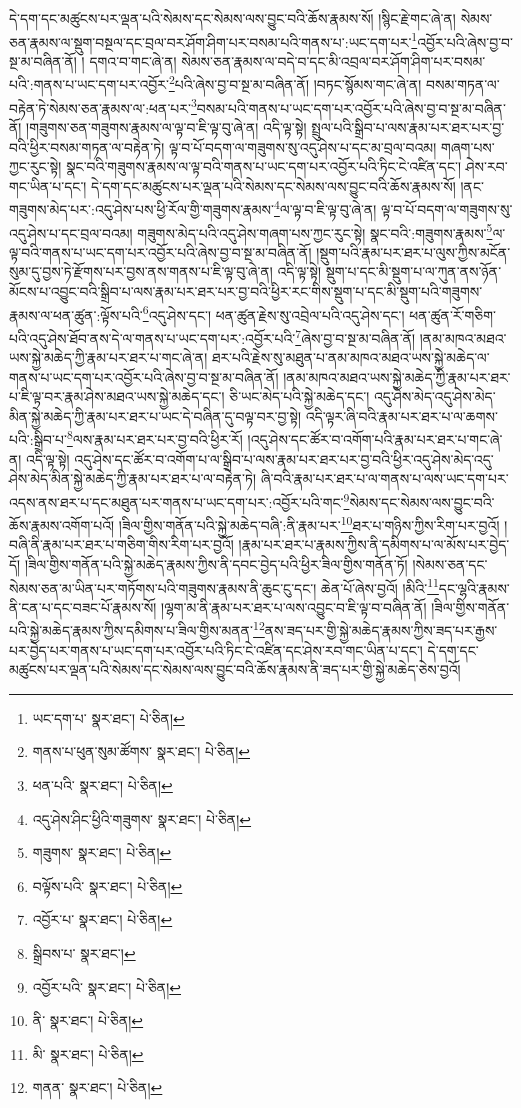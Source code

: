དེ་དག་དང་མཚུངས་པར་ལྡན་པའི་སེམས་དང་སེམས་ལས་བྱུང་བའི་ཆོས་རྣམས་སོ། །སྙིང་རྗེ་གང་ཞེ་ན། སེམས་ཅན་རྣམས་ལ་སྡུག་བསྔལ་དང་བྲལ་བར་ཤོག་ཤིག་པར་བསམ་པའི་གནས་པ་:ཡང་དག་པར་\footnote{ཡང་དག་པ་  སྣར་ཐང་།  པེ་ཅིན། }འབྱོར་པའི་ཞེས་བྱ་བ་སྔ་མ་བཞིན་ནོ། །
དགའ་བ་གང་ཞེ་ན། སེམས་ཅན་རྣམས་ལ་བདེ་བ་དང་མི་འབྲལ་བར་ཤོག་ཤིག་པར་བསམ་པའི་:གནས་པ་ཡང་དག་པར་འབྱོར་\footnote{གནས་པ་ཕུན་སུམ་ཚོགས་  སྣར་ཐང་།  པེ་ཅིན། }པའི་ཞེས་བྱ་བ་སྔ་མ་བཞིན་ནོ། །བཏང་སྙོམས་གང་ཞེ་ན། བསམ་གཏན་ལ་བརྟེན་ཏེ་སེམས་ཅན་རྣམས་ལ་:ཕན་པར་\footnote{ཕན་པའི་  སྣར་ཐང་།  པེ་ཅིན། }བསམ་པའི་གནས་པ་ཡང་དག་པར་འབྱོར་པའི་ཞེས་བྱ་བ་སྔ་མ་བཞིན་ནོ། །གཟུགས་ཅན་གཟུགས་རྣམས་ལ་ལྟ་བ་ཇི་ལྟ་བུ་ཞེ་ན། འདི་ལྟ་སྟེ། སྤྲུལ་པའི་སྒྲིབ་པ་ལས་རྣམ་པར་ཐར་པར་བྱ་བའི་ཕྱིར་བསམ་གཏན་ལ་བརྟེན་ཏེ། ལྟ་བ་པོ་བདག་ལ་གཟུགས་སུ་འདུ་ཤེས་པ་དང་མ་བྲལ་བའམ། གཞག་པས་ཀྱང་རུང་སྟེ། སྣང་བའི་གཟུགས་རྣམས་ལ་ལྟ་བའི་གནས་པ་ཡང་དག་པར་འབྱོར་པའི་ཏིང་ངེ་འཛིན་དང་། ཤེས་རབ་གང་ཡིན་པ་དང་། དེ་དག་དང་མཚུངས་པར་ལྡན་པའི་སེམས་དང་སེམས་ལས་བྱུང་བའི་ཆོས་རྣམས་སོ། །ནང་གཟུགས་མེད་པར་:འདུ་ཤེས་པས་ཕྱི་རོལ་གྱི་གཟུགས་རྣམས་\footnote{འདུ་ཤེས་ཤིང་ཕྱིའི་གཟུགས་  སྣར་ཐང་།  པེ་ཅིན། }ལ་ལྟ་བ་ཇི་ལྟ་བུ་ཞེ་ན། ལྟ་བ་པོ་བདག་ལ་གཟུགས་སུ་འདུ་ཤེས་པ་དང་བྲལ་བའམ། གཟུགས་མེད་པའི་འདུ་ཤེས་གཞག་པས་ཀྱང་རུང་སྟེ། སྣང་བའི་:གཟུགས་རྣམས་\footnote{གཟུགས་  སྣར་ཐང་།  པེ་ཅིན། }ལ་ལྟ་བའི་གནས་པ་ཡང་དག་པར་འབྱོར་པའི་ཞེས་བྱ་བ་སྔ་མ་བཞིན་ནོ། །སྡུག་པའི་རྣམ་པར་ཐར་པ་ལུས་ཀྱིས་མངོན་སུམ་དུ་བྱས་ཏེ་རྫོགས་པར་བྱས་ནས་གནས་པ་ཇི་ལྟ་བུ་ཞེ་ན། འདི་ལྟ་སྟེ། སྡུག་པ་དང་མི་སྡུག་པ་ལ་ཀུན་ནས་ཉོན་མོངས་པ་འབྱུང་བའི་སྒྲིབ་པ་ལས་རྣམ་པར་ཐར་པར་བྱ་བའི་ཕྱིར་རང་གིས་སྡུག་པ་དང་མི་སྡུག་པའི་གཟུགས་རྣམས་ལ་ཕན་ཚུན་:ལྟོས་པའི་\footnote{བལྟོས་པའི་  སྣར་ཐང་།  པེ་ཅིན། }འདུ་ཤེས་དང་། ཕན་ཚུན་རྗེས་སུ་འབྲེལ་པའི་འདུ་ཤེས་དང་། ཕན་ཚུན་རོ་གཅིག་པའི་འདུ་ཤེས་ཐོབ་ནས་དེ་ལ་གནས་པ་ཡང་དག་པར་:འབྱོར་པའི་\footnote{འབྱོར་པ་  སྣར་ཐང་།  པེ་ཅིན། }ཞེས་བྱ་བ་སྔ་མ་བཞིན་ནོ། །ནམ་མཁའ་མཐའ་ཡས་སྐྱེ་མཆེད་ཀྱི་རྣམ་པར་ཐར་པ་གང་ཞེ་ན། ཐར་པའི་རྗེས་སུ་མཐུན་པ་ནམ་མཁའ་མཐའ་ཡས་སྐྱེ་མཆེད་ལ་གནས་པ་ཡང་དག་པར་འབྱོར་པའི་ཞེས་བྱ་བ་སྔ་མ་བཞིན་ནོ། །ནམ་མཁའ་མཐའ་ཡས་སྐྱེ་མཆེད་ཀྱི་རྣམ་པར་ཐར་པ་ཇི་ལྟ་བར་རྣམ་ཤེས་མཐའ་ཡས་སྐྱེ་མཆེད་དང་། ཅི་ཡང་མེད་པའི་སྐྱེ་མཆེད་དང་། འདུ་ཤེས་མེད་འདུ་ཤེས་མེད་མིན་སྐྱེ་མཆེད་ཀྱི་རྣམ་པར་ཐར་པ་ཡང་དེ་བཞིན་དུ་བལྟ་བར་བྱ་སྟེ། འདི་ལྟར་ཞི་བའི་རྣམ་པར་ཐར་པ་ལ་ཆགས་པའི་:སྒྲིབ་པ་\footnote{སྒྲིབས་པ་  སྣར་ཐང་། }ལས་རྣམ་པར་ཐར་པར་བྱ་བའི་ཕྱིར་རོ། །འདུ་ཤེས་དང་ཚོར་བ་འགོག་པའི་རྣམ་པར་ཐར་པ་གང་ཞེ་ན། འདི་ལྟ་སྟེ། འདུ་ཤེས་དང་ཚོར་བ་འགོག་པ་ལ་སྒྲིབ་པ་ལས་རྣམ་པར་ཐར་པར་བྱ་བའི་ཕྱིར་འདུ་ཤེས་མེད་འདུ་ཤེས་མེད་མིན་སྐྱེ་མཆེད་ཀྱི་རྣམ་པར་ཐར་པ་ལ་བརྟེན་ཏེ། ཞི་བའི་རྣམ་པར་ཐར་པ་ལ་གནས་པ་ལས་ཡང་དག་པར་འདས་ནས་ཐར་པ་དང་མཐུན་པར་གནས་པ་ཡང་དག་པར་:འབྱོར་པའི་གང་\footnote{འབྱོར་པའི་  སྣར་ཐང་།  པེ་ཅིན། }སེམས་དང་སེམས་ལས་བྱུང་བའི་ཆོས་རྣམས་འགོག་པའོ། །ཟིལ་གྱིས་གནོན་པའི་སྐྱེ་མཆེད་བཞི་:ནི་རྣམ་པར་\footnote{ནི་  སྣར་ཐང་།  པེ་ཅིན། }ཐར་པ་གཉིས་ཀྱིས་རིག་པར་བྱའོ། །བཞི་ནི་རྣམ་པར་ཐར་པ་གཅིག་གིས་རིག་པར་བྱའོ། །རྣམ་པར་ཐར་པ་རྣམས་ཀྱིས་ནི་དམིགས་པ་ལ་མོས་པར་བྱེད་དོ། །ཟིལ་གྱིས་གནོན་པའི་སྐྱེ་མཆེད་རྣམས་ཀྱིས་ནི་དབང་བྱེད་པའི་ཕྱིར་ཟིལ་གྱིས་གནོན་ཏོ། །སེམས་ཅན་དང་སེམས་ཅན་མ་ཡིན་པར་གཏོགས་པའི་གཟུགས་རྣམས་ནི་ཆུང་ངུ་དང་། ཆེན་པོ་ཞེས་བྱའོ། །མིའི་\footnote{མི་  སྣར་ཐང་།  པེ་ཅིན། }དང་ལྷའི་རྣམས་ནི་ངན་པ་དང་བཟང་པོ་རྣམས་སོ། །ལྷག་མ་ནི་རྣམ་པར་ཐར་པ་ལས་འབྱུང་བ་ཇི་ལྟ་བ་བཞིན་ནོ། །ཟིལ་གྱིས་གནོན་པའི་སྐྱེ་མཆེད་རྣམས་ཀྱིས་དམིགས་པ་ཟིལ་གྱིས་མནན་\footnote{གནན་  སྣར་ཐང་།  པེ་ཅིན། }ནས་ཟད་པར་གྱི་སྐྱེ་མཆེད་རྣམས་ཀྱིས་ཟད་པར་རྒྱས་པར་བྱེད་པར་གནས་པ་ཡང་དག་པར་འབྱོར་པའི་ཏིང་ངེ་འཛིན་དང་ཤེས་རབ་གང་ཡིན་པ་དང་། དེ་དག་དང་མཚུངས་པར་ལྡན་པའི་སེམས་དང་སེམས་ལས་བྱུང་བའི་ཆོས་རྣམས་ནི་ཟད་པར་གྱི་སྐྱེ་མཆེད་ཅེས་བྱའོ། 